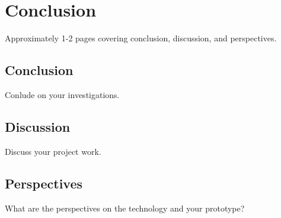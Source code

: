 \documentclass[Preamble]{subfiles}
\begin{document}
\chapter{Conclusion}
Approximately 1-2 pages covering conclusion, discussion, and perspectives.
\section{Conclusion}
Conlude on your investigations.
\section{Discussion}
Discuss your project work.
\section{Perspectives}
What are the perspectives on the technology and your prototype? 
\end{document}

